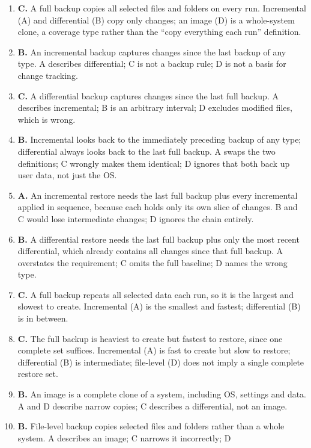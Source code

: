 \begin{enumerate}[label=\textbf{Q\arabic*.}, leftmargin=*]
\item \textbf{C.} A full backup copies all selected files and folders on every
  run. Incremental (A) and differential (B) copy only changes; an image (D)
  is a whole-system clone, a coverage type rather than the ``copy everything
  each run'' definition.
\item \textbf{B.} An incremental backup captures changes since the last backup
  of any type. A describes differential; C is not a backup rule; D is not a
  basis for change tracking.
\item \textbf{C.} A differential backup captures changes since the last full
  backup. A describes incremental; B is an arbitrary interval; D excludes
  modified files, which is wrong.
\item \textbf{B.} Incremental looks back to the immediately preceding backup
  of any type; differential always looks back to the last full backup. A
  swaps the two definitions; C wrongly makes them identical; D ignores that
  both back up user data, not just the OS.
\item \textbf{A.} An incremental restore needs the last full backup plus every
  incremental applied in sequence, because each holds only its own slice of
  changes. B and C would lose intermediate changes; D ignores the chain
  entirely.
\item \textbf{B.} A differential restore needs the last full backup plus only
  the most recent differential, which already contains all changes since that
  full backup. A overstates the requirement; C omits the full baseline; D
  names the wrong type.
\item \textbf{C.} A full backup repeats all selected data each run, so it is
  the largest and slowest to create. Incremental (A) is the smallest and
  fastest; differential (B) is in between.
\item \textbf{C.} The full backup is heaviest to create but fastest to
  restore, since one complete set suffices. Incremental (A) is fast to create
  but slow to restore; differential (B) is intermediate; file-level (D) does
  not imply a single complete restore set.
\item \textbf{B.} An image is a complete clone of a system, including OS,
  settings and data. A and D describe narrow copies; C describes a
  differential, not an image.
\item \textbf{B.} File-level backup copies selected files and folders rather
  than a whole system. A describes an image; C narrows it incorrectly; D

\end{enumerate}

